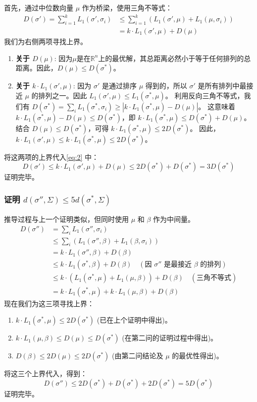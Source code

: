 \documentclass{ctexart}
\begin{document}
首先，通过中位数向量 $\mu$ 作为桥梁，使用三角不等式：
\begin{align*}
D(\sigma') = \sum_{i=1}^{k} L_1(\sigma', \sigma_i) &\le \sum_{i=1}^{k} (L_1(\sigma', \mu) + L_1(\mu, \sigma_i)) \\
&= k \cdot L_1(\sigma', \mu) + D(\mu) \label{eq:2} \tag{**}
\end{align*}
我们为右侧两项寻找上界。
\begin{enumerate}
    \item \textbf{关于 $D(\mu)$}: 因为$\mu$是在$\mathbb{R}^n$上的最优解，其总距离必然小于等于任何排列的总距离。因此，$D(\mu) \le D(\sigma^*)$。
    \item \textbf{关于 $k \cdot L_1(\sigma', \mu)$}: 因为 $\sigma'$ 是通过排序 $\mu$ 得到的，所以 $\sigma'$ 是所有排列中最接近 $\mu$ 的排列之一。因此 $L_1(\sigma', \mu) \le L_1(\sigma^*, \mu)$。
    利用反向三角不等式，我们有 $D(\sigma^*) = \sum_i L_1(\sigma^*, \sigma_i) \ge |k \cdot L_1(\sigma^*, \mu) - D(\mu)|$。
    这意味着 $k \cdot L_1(\sigma^*, \mu) - D(\mu) \le D(\sigma^*)$，即 $k \cdot L_1(\sigma^*, \mu) \le D(\sigma^*) + D(\mu)$。
    结合 $D(\mu) \le D(\sigma^*)$，可得 $k \cdot L_1(\sigma^*, \mu) \le 2D(\sigma^*)$。
    因此，$k \cdot L_1(\sigma', \mu) \le k \cdot L_1(\sigma^*, \mu) \le 2D(\sigma^*)$。
\end{enumerate}
将这两项的上界代入\cref{eq:2} 中：
$$ D(\sigma') \le k \cdot L_1(\sigma', \mu) + D(\mu) \le 2D(\sigma^*) + D(\sigma^*) = 3D(\sigma^*) $$
证明完毕。


\subsubsection{证明 $d(\sigma'', \Sigma) \le 5d(\sigma^*, \Sigma)$}

推导过程与上一个证明类似，但同时使用 $\mu$ 和 $\beta$ 作为中间量。
\begin{align*}
D(\sigma'') &= \sum_i L_1(\sigma'', \sigma_i) \\
&\le \sum_i (L_1(\sigma'', \beta) + L_1(\beta, \sigma_i))\\
&= k \cdot L_1(\sigma'', \beta) + D(\beta) \\
&\le k \cdot L_1(\sigma^*, \beta) + D(\beta) \quad (\text{因 } \sigma'' \text{ 是最接近 } \beta \text{ 的排列}) \\
&\le k \cdot (L_1(\sigma^*, \mu) + L_1(\mu, \beta)) + D(\beta) \quad (\text{三角不等式}) \\
&= k \cdot L_1(\sigma^*, \mu) + k \cdot L_1(\mu, \beta) + D(\beta)
\end{align*}
现在我们为这三项寻找上界：
\begin{enumerate}
    \item $k \cdot L_1(\sigma^*, \mu) \le 2D(\sigma^*)$ (已在上个证明中得出)。
    \item $k \cdot L_1(\mu, \beta) \le D(\mu) \le D(\sigma^*)$ (在第二问的证明过程中得出)。
    \item $D(\beta) \le 2D(\mu) \le 2D(\sigma^*)$ (由第二问结论及 $\mu$ 的最优性得出)。
\end{enumerate}
将这三个上界代入，得到：
$$ D(\sigma'') \le 2D(\sigma^*) + D(\sigma^*) + 2D(\sigma^*) = 5D(\sigma^*) $$
证明完毕。
\end{document}

